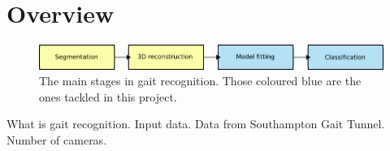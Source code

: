 \section{Overview}

\begin{figure}[b]
	\centering
	\includegraphics[width=12cm]{overview.png}
	\caption{The main stages in gait recognition.
		Those coloured blue are the ones tackled in this project.}
	\label{OverviewBoxes}
\end{figure}

What is gait recognition.
Input data.
Data from Southampton Gait Tunnel.
Number of cameras.


